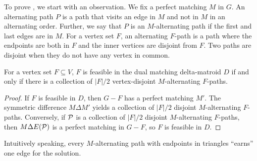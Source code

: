 To prove , we start with an observation.
We fix a perfect matching $M$ in $G$.
An alternating path $P$ is a path that visits an edge in $M$ and not in $M$ in an alternating order.
Further, we say that $P$ is an $M$-alternating path if the first and last edges are in $M$.
For a vertex set $F$, an alternating $F$-path is a path where the endpoints are both in $F$ and the inner vertices are disjoint from $F$.
Two paths are disjoint when they do not have any vertex in common.

\begin{lemma}
  \label{lemma:alt-paths}
  For a vertex set $F \subseteq V$, $F$ is feasible in the dual matching delta-matroid $D$ if and only if there is a collection of $|F|/2$ vertex-disjoint $M$-alternating $F$-paths.
\end{lemma}
\begin{proof}
  If $F$ is feasible in $D$, then $G - F$ has a perfect matching $M'$.
  The symmetric difference $M \Delta M'$ yields a collection of $|F|/2$ disjoint $M$-alternating $F$-paths.
  Conversely, if $\mathcal P$ is a collection of $|F|/2$ disjoint $M$-alternating $F$-paths, then $M \Delta E(\mathcal P)$ is a perfect matching in $G - F$, so $F$ is feasible in $D$.
\end{proof}

Intuitively speaking, every $M$-alternating path with endpoints in triangles ``earns'' one edge for the solution.

